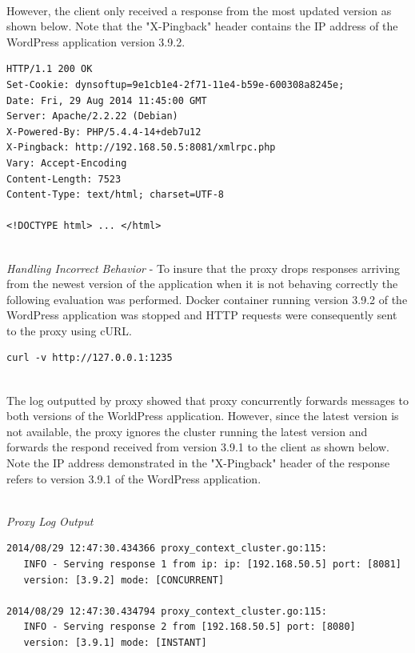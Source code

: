 \documentclass[a4paper,11pt,twoside]{report}
\begin{document}
\noindent\\
However, the client only received a response from the most updated version as shown below. Note that the "X-Pingback" header contains the IP address of the WordPress application version 3.9.2. \smallskip

\begin{lstlisting}[language=terminal]
HTTP/1.1 200 OK
Set-Cookie: dynsoftup=9e1cb1e4-2f71-11e4-b59e-600308a8245e;
Date: Fri, 29 Aug 2014 11:45:00 GMT
Server: Apache/2.2.22 (Debian)
X-Powered-By: PHP/5.4.4-14+deb7u12
X-Pingback: http://192.168.50.5:8081/xmlrpc.php
Vary: Accept-Encoding
Content-Length: 7523
Content-Type: text/html; charset=UTF-8

<!DOCTYPE html> ... </html>
\end{lstlisting}

\noindent\\
\textit{Handling Incorrect Behavior} - To insure that the proxy drops responses arriving from the newest version of the application when it is not behaving correctly the following evaluation was performed. Docker container running version 3.9.2 of the WordPress application was stopped and HTTP requests were consequently sent to the proxy using cURL.\smallskip

\begin{lstlisting}[language=terminal]
curl -v http://127.0.0.1:1235
\end{lstlisting}

\noindent\\
The log outputted by proxy showed that proxy concurrently forwards messages to both versions of the WorldPress application. However, since the latest version is not available, the proxy ignores the cluster running the latest version and forwards the respond received from version 3.9.1 to the client as shown below. Note the IP address demonstrated in the "X-Pingback" header of the response refers to version 3.9.1 of the WordPress application.    

\noindent\\
\textit{Proxy Log Output}
\begin{lstlisting}[language=terminal]
2014/08/29 12:47:30.434366 proxy_context_cluster.go:115:     
   INFO - Serving response 1 from ip: ip: [192.168.50.5] port: [8081] 
   version: [3.9.2] mode: [CONCURRENT]
   
2014/08/29 12:47:30.434794 proxy_context_cluster.go:115:     
   INFO - Serving response 2 from [192.168.50.5] port: [8080] 
   version: [3.9.1] mode: [INSTANT]
\end{lstlisting}
\end{document}
